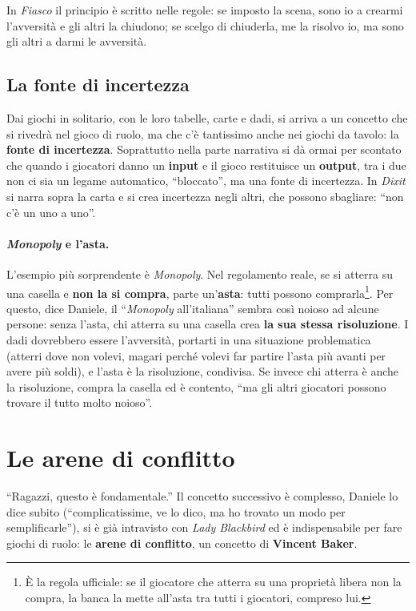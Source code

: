 In \emph{Fiasco} il principio è scritto nelle regole: se imposto la scena, sono io a crearmi
l'avversità e gli altri la chiudono; se scelgo di chiuderla, me la risolvo io, ma sono gli altri a
darmi le avversità.

\subsection{La fonte di incertezza}

Dai giochi in solitario, con le loro tabelle, carte e dadi, si arriva a un concetto che si
rivedrà nel gioco di ruolo, ma che c'è tantissimo anche nei giochi da tavolo: la \textbf{fonte di
incertezza}. Soprattutto nella parte narrativa si dà ormai per scontato che quando i giocatori
danno un \textbf{input} e il gioco restituisce un \textbf{output}, tra i due non ci sia un legame
automatico, ``bloccato'', ma una fonte di incertezza. In \emph{Dixit} si narra sopra la carta e si
crea incertezza negli altri, che possono sbagliare: ``non c'è un uno a uno''.

\paragraph{\emph{Monopoly} e l'asta.} L'esempio più sorprendente è \emph{Monopoly}. Nel regolamento
reale, se si atterra su una casella e \textbf{non la si compra}, parte un'\textbf{asta}: tutti
possono comprarla\footnote{È la regola ufficiale: se il giocatore che atterra su una proprietà
libera non la compra, la banca la mette all'asta tra tutti i giocatori, compreso lui.}. Per questo,
dice Daniele, il ``\emph{Monopoly} all'italiana'' sembra così noioso ad alcune persone: senza
l'asta, chi atterra su una casella crea \textbf{la sua stessa risoluzione}. I dadi dovrebbero
essere l'avversità, portarti in una situazione problematica (atterri dove non volevi, magari perché
volevi far partire l'asta più avanti per avere più soldi), e l'asta è la risoluzione, condivisa. Se
invece chi atterra è anche la risoluzione, compra la casella ed è contento, ``ma gli altri giocatori
possono trovare il tutto molto noioso''.

\section{Le arene di conflitto}
\label{a16:sec:arene}

``Ragazzi, questo è fondamentale.'' Il concetto successivo è complesso, Daniele lo dice subito
(``complicatissime, ve lo dico, ma ho trovato un modo per semplificarle''), si è già intravisto con
\emph{Lady Blackbird} ed è indispensabile per fare giochi di ruolo: le \textbf{arene di conflitto},
un concetto di \textbf{Vincent Baker}.

